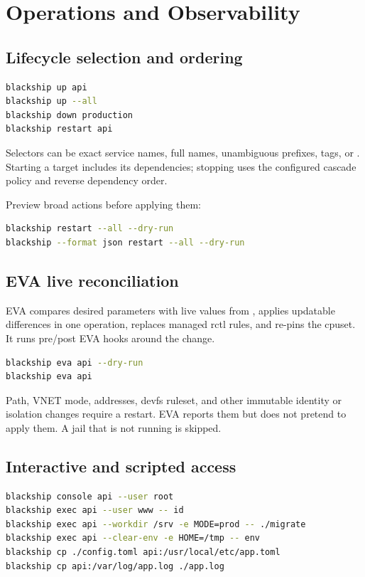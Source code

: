 \chapter{Operations and Observability}
\label{ch:operations}

\section{Lifecycle selection and ordering}

\begin{lstlisting}[language=bash]
blackship up api
blackship up --all
blackship down production
blackship restart api
\end{lstlisting}

Selectors can be exact service names, full names, unambiguous prefixes, tags,
or . Starting a target includes its dependencies; stopping uses the
configured cascade policy and reverse dependency order.

Preview broad actions before applying them:

\begin{lstlisting}[language=bash]
blackship restart --all --dry-run
blackship --format json restart --all --dry-run
\end{lstlisting}

\section{EVA live reconciliation}

EVA compares desired parameters with live values from , applies
updatable differences in one  operation,
replaces managed rctl rules, and re-pins the cpuset. It runs pre/post EVA hooks
around the change.

\begin{lstlisting}[language=bash]
blackship eva api --dry-run
blackship eva api
\end{lstlisting}

Path, VNET mode, addresses, devfs ruleset, and other immutable identity or
isolation changes require a restart. EVA reports them but does not pretend to
apply them. A jail that is not running is skipped.

\section{Interactive and scripted access}

\begin{lstlisting}[language=bash]
blackship console api --user root
blackship exec api --user www -- id
blackship exec api --workdir /srv -e MODE=prod -- ./migrate
blackship exec api --clear-env -e HOME=/tmp -- env
blackship cp ./config.toml api:/usr/local/etc/app.toml
blackship cp api:/var/log/app.log ./app.log
\end{lstlisting}

